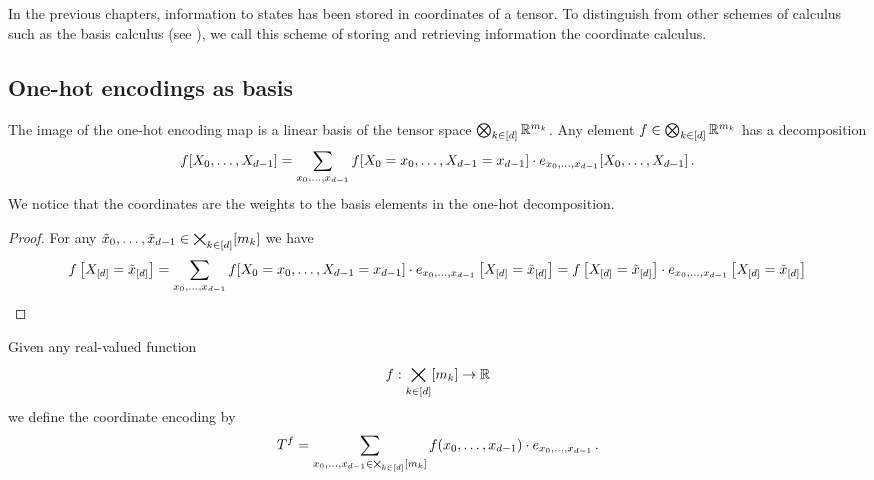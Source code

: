 \section{\chatextcoordinateCalculus} \label{cha:coordinateCalculus}

In the previous chapters, information to states has been stored in coordinates of a tensor.
To distinguish from other schemes of calculus such as the basis calculus (see ), we call this scheme of storing and retrieving information the coordinate calculus.

\subsection{One-hot encodings as basis}

\begin{lemma}
    \label{lem:tensorBasisDecomposition}
    The image of the one-hot encoding map is a linear basis of the tensor space $\bigotimes_{k\in[d]} \mathbb{R}^{m_{k}}$.
    Any element $f\in\bigotimes_{k\in[d]} \mathbb{R}^{m_{k}}$ has a decomposition
    \[ f[X_{0},\ldots,X_{d-1}] = \sum_{x_{0},\ldots,x_{d-1}} f[X_{0}=x_{0},\ldots,X_{d-1}=x_{d-1}] \cdot e_{x_{0},\ldots,x_{d-1}}[X_{0},\ldots,X_{d-1}] \, . \]
    We notice that the coordinates are the weights to the basis elements in the one-hot decomposition.
\end{lemma}
\begin{proof}
    For any $\tilde{x}_{0},\ldots,\tilde{x}_{d-1}\in\bigtimes_{k\in[d]}[m_{k}]$ we have
    \[ f\left[X_{[d]}=\tilde{x}_{[d]}\right]
    = \sum_{x_{0},\ldots,x_{d-1}} f[X_{0}=x_{0},\ldots,X_{d-1}=x_{d-1}] \cdot e_{x_{0},\ldots,x_{d-1}}\left[X_{[d]}=\tilde{x}_{[d]}\right]
    = f\left[X_{[d]}=\tilde{x}_{[d]}\right] \cdot e_{x_{0},\ldots,x_{d-1}}\left[X_{[d]}=\tilde{x}_{[d]}\right]   \]
\end{proof}


\begin{definition}
    Given any real-valued function
    \[ f : \bigtimes_{k\in[d]}[m_{k}] \rightarrow \mathbb{R} \]
    we define the coordinate encoding by
    \[ T^{f} = \sum_{x_{0},\ldots,x_{d-1}\in\bigtimes_{k\in[d]}[m_{k}]} f(x_{0},\ldots,x_{d-1}) \cdot e_{x_{0},\ldots,x_{d-1}} \, . \]
\end{definition}


